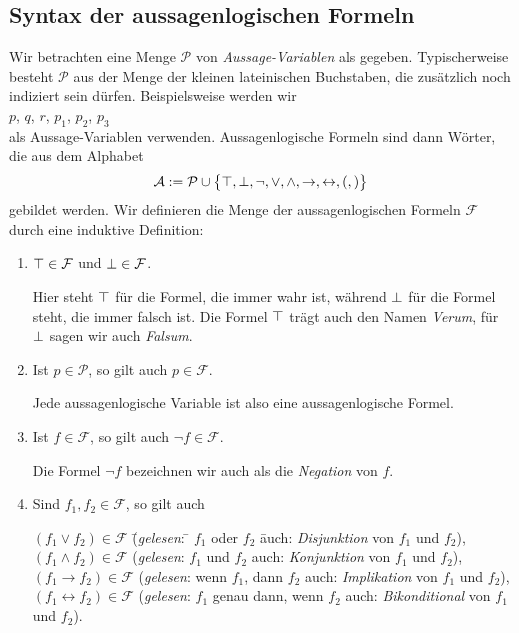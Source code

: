 \subsection{Syntax der aussagenlogischen Formeln}
Wir betrachten eine Menge $\mathcal{P}$ von  \emph{\color{blue}Aussage-Variablen} als gegeben.
Typischerweise besteht $\mathcal{P}$ aus der Menge der kleinen lateinischen Buchstaben, die
zus\"atzlich noch indiziert sein d\"urfen.  Beispielsweise werden wir
\\[0.2cm]
\hspace*{1.3cm}
$p$, $q$, $r$, $p_1$, $p_2$, $p_3$
\\[0.2cm]
als Aussage-Variablen verwenden.
Aussagenlogische Formeln sind dann W\"{o}rter, die aus dem Alphabet
$$ 
  \mathcal{A} := \mathcal{P} \cup \bigl\{ \top, \bot, \neg, \vee, \wedge,
   \rightarrow, \leftrightarrow, (, ) \bigr\}
$$
gebildet werden.  Wir definieren die Menge der aussagenlogischen Formeln
$\mathcal{F}$ durch eine induktive Definition:
\begin{enumerate}
\item $\top \in \mathcal{F}$ und $\bot \in \mathcal{F}$.

      Hier steht $\top$ f\"{u}r die Formel, die immer wahr ist, w\"{a}hrend $\bot$ f\"{u}r die 
      Formel steht, die immer falsch ist.  Die Formel $\top$ tr\"{a}gt auch den Namen
      \textsl{\color{blue}Verum},
      f\"{u}r $\bot$ sagen wir auch \textsl{\color{blue}Falsum}.
\item Ist $p \in \mathcal{P}$, so gilt auch $p \in \mathcal{F}$.

      Jede aussagenlogische Variable ist also eine aussagenlogische Formel.
\item Ist $f \in \mathcal{F}$, so gilt auch $\neg f \in \mathcal{F}$.

      Die Formel $\neg f$ bezeichnen wir auch als die \emph{\color{blue}Negation} von $f$.
\item Sind $f_1, f_2 \in \mathcal{F}$, so gilt auch
      \begin{tabbing}
        $(f_1 \vee f_2) \in \mathcal{F}$ \hspace*{0.5cm} \= (\textsl{gelesen}: \quad \= $f_1$ oder $f_2$ \hspace*{2.5cm} \=
         auch: \emph{\color{blue}Disjunktion} von $f_1$ und $f_2$),            \\
        $(f_1 \wedge f_2) \in \mathcal{F}$                 \> (\textsl{gelesen}:       \> $f_1$ und $f_2$ \>
         auch: \emph{\color{blue}Konjunktion} von $f_1$ und $f_2$),            \\
        $(f_1 \rightarrow f_2) \in \mathcal{F}$                \> (\textsl{gelesen}:       \> wenn $f_1$, dann $f_2$ \>
         auch: \emph{\color{blue}Implikation} von $f_1$ und $f_2$),            \\
        $(f_1 \leftrightarrow f_2) \in \mathcal{F}$                \> (\textsl{gelesen}:       \> $f_1$ genau dann, wenn $f_2$ \>
         auch: \emph{\color{blue}Bikonditional} von $f_1$ und $f_2$).            
      \end{tabbing}
\end{enumerate}

